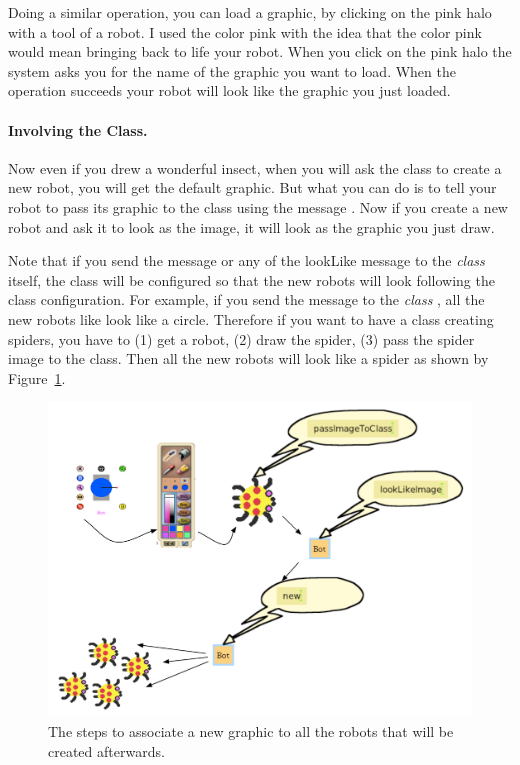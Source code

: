 Doing a similar operation, you can load a graphic, by clicking on the pink halo with a tool of a robot. I used the color pink with the idea that the color pink would mean  bringing back to life your robot. When you click on the pink halo the system asks you for the name of the graphic you want to load. When the operation succeeds your robot will look like the graphic you just loaded. 

\paragraph{Involving the Class.} Now even if you drew a wonderful insect, when you will ask the class to create a new robot, you will get the default graphic. But what you can do is to tell your robot to pass its graphic to the class using the message . Now if you create a new robot and ask it to look as the image, it will look as the graphic you just draw. 

Note that if you send the message  or any of the lookLike message to the \emph{class} itself, the class will be configured so that the new robots will look following
the class configuration.  For example, if you send the message  to the \emph{class} , all the new robots like look like a circle. Therefore if you want to have a class creating spiders, you have to (1) get a robot, (2) draw the spider, (3) pass the spider image to the class. Then all the new robots will look like  a spider as shown by Figure~\ref{fig:allGraphics}.


\begin{figure}[h]
\begin{center}
\includegraphics[width=16cm]{allGraphics2}
\end{center}
\caption{The steps to associate a new graphic to all the robots that will be created afterwards. \label{fig:allGraphics}}
\end{figure}




